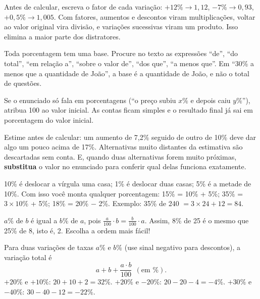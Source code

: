 \begin{dica}
Antes de calcular, escreva o fator de cada variação: $+12\%\to 1{,}12$,
$-7\%\to 0{,}93$, $+0{,}5\%\to 1{,}005$. Com fatores, aumentos e descontos
viram multiplicações, voltar ao valor original vira divisão, e variações
sucessivas viram um produto. Isso elimina a maior parte dos distratores.
\end{dica}

\begin{dica}
Toda porcentagem tem uma base. Procure no texto as expressões ``de'', ``do
total'', ``em relação a'', ``sobre o valor de'', ``dos que'', ``a menos que''.
Em ``30\% a menos que a quantidade de João'', a base é a quantidade de João, e
não o total de questões.
\end{dica}

\begin{dica}
Se o enunciado só fala em porcentagens (``o preço subiu $x\%$ e depois
caiu $y\%$''), atribua 100 ao valor inicial. As contas ficam simples e o
resultado final já sai em porcentagem do valor inicial.
\end{dica}

\begin{dica}
Estime antes de calcular: um aumento de 7,2\% seguido de outro de 10\% deve dar
algo um pouco acima de 17\%. Alternativas muito distantes da estimativa são
descartadas sem conta. E, quando duas alternativas forem muito próximas,
\textbf{substitua} o valor no enunciado para conferir qual delas funciona
exatamente.
\end{dica}

\begin{macete}[10\%, 5\% e 1\% de cabeça]
10\% é deslocar a vírgula uma casa; 1\% é deslocar duas casas; 5\% é a metade
de 10\%. Com isso você monta qualquer porcentagem: 15\% = 10\% + 5\%;
35\% = $3\times 10\%$ + 5\%; 18\% = 20\% $-$ 2\%.
Exemplo: 35\% de 240 $= 3\times 24 + 12 = 84$.
\end{macete}

\begin{macete}
$a\%$ de $b$ é igual a $b\%$ de $a$, pois $\frac{a}{100}\cdot b = \frac{b}{100}\cdot a$.
Assim, 8\% de 25 é o mesmo que 25\% de 8, isto é, 2. Escolha a ordem mais fácil!
\end{macete}

\begin{macete}
Para duas variações de taxas $a\%$ e $b\%$ (use sinal negativo para
descontos), a variação total é
\[ a + b + \frac{a\cdot b}{100}\ \ (\text{em }\%). \]
$+20\%$ e $+10\%$: $20+10+2 = 32\%$. \quad $+20\%$ e $-20\%$: $20-20-4 = -4\%$.
\quad $+30\%$ e $-40\%$: $30-40-12 = -22\%$.
\end{macete}

